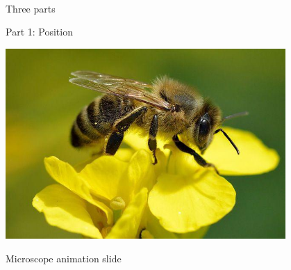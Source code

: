 \documentclass[presentation]{beamer}
\begin{document}
\begin{frame}
\begin{columns}[totalwidth=6cm]
\begin{column}{.5\textwidth}
      \\
      \\
      \\
    \end{column}
  \end{columns}
  \centering
  \vspace{2em}
\end{frame}

\begin{frame}{Three parts}
  
\end{frame}

\begin{frame}[label=sec-1]{Part 1: Position}
 \begin{center}
   \includegraphics[width=0.8\textwidth]{figs/bee1.jpg}
 \end{center}
\end{frame}

\begin{frame}{Microscope animation slide}
  
\end{frame}
\end{document}
